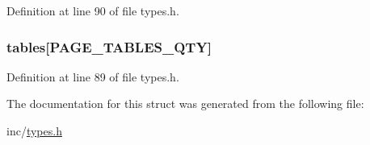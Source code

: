 Definition at line 90 of file types.h.

\hypertarget{structdirectory_a3e0d7ce1ada814ee34fecb417f482914}{
\subsubsection[{tables}]{ {\bf tables}\mbox{[}PAGE\_\-TABLES\_\-QTY\mbox{]}}}
\label{structdirectory_a3e0d7ce1ada814ee34fecb417f482914}


Definition at line 89 of file types.h.



The documentation for this struct was generated from the following file:\begin{DoxyCompactItemize}
\item 
inc/\hyperlink{types_8h}{types.h}\end{DoxyCompactItemize}
